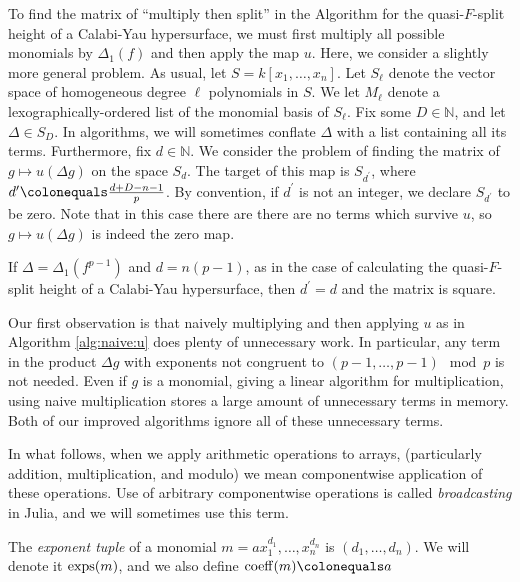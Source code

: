 
To find the matrix of ``multiply then split''
in the Algorithm for the quasi-\(F\)-split height
of a Calabi-Yau hypersurface, 
we must first multiply all possible 
monomials by \(\Delta_{1}(f)\) 
and then apply the map \(u\).
Here, we consider a slightly more general problem.
As usual, let \(S = k[x_{1}, \ldots, x_{n}]\).
Let $S_\ell$ denote the vector space of homogeneous degree $\ell$ polynomials in \(S\).
We let \(M_{\ell}\) denote a lexographically-ordered list
of the monomial basis of \(S_{\ell}\).
Fix some \(D \in \mathbb{N}\), and let \(\Delta \in S_D\).
In algorithms, we will sometimes conflate \(\Delta\) 
with a list containing all its terms.
Furthermore, fix \(d \in \mathbb{N}\).
We consider the problem of finding the matrix of 
\(g \mapsto u(\Delta g)\)
on the space \(S_{d}\).
The target of this map is
\(S_{d^{\prime}}\), where
\(d^{\prime} \colonequals \frac{d+D-n-1}{p}\).
By convention, if \(d^{\prime}\) is not an integer,
we declare \(S_{d^{\prime}}\) to be zero.
Note that in this case there are
there are no terms which survive \(u\), so
\(g \mapsto u(\Delta g)\) is indeed the zero map.

\begin{rmk}
    If \(\Delta = \Delta_{1}(f^{p-1})\) and \(d = n(p-1)\),
	as in the case of calculating the quasi-\(F\)-split
	height of a Calabi-Yau hypersurface, 
	then \(d^{\prime} = d\) and the matrix is 
	square.
\end{rmk}

Our first observation is that naively 
multiplying and then applying \(u\) 
as in Algorithm \ref{alg:naive:u}
does plenty of unnecessary work.
In particular, any term in the 
product \(\Delta g\) with exponents 
not congruent to 
\((p-1, \ldots, p-1) \mod p\)
is not needed. 
Even if \(g\) is a monomial, giving a linear
algorithm for multiplication, using naive
multiplication stores a large amount of unnecessary terms
in memory.
Both of our improved algorithms ignore
all of these unnecessary terms.

In what follows, 
when we apply arithmetic operations to arrays, 
(particularly addition, multiplication, and modulo)
we mean componentwise application of these operations.
Use of arbitrary componentwise operations is called
\textit{broadcasting} in Julia, and we will
sometimes use this term.

\begin{defn}
    The \textit{exponent tuple} of a monomial 
    $m = ax_{1}^{d_1}, \dots, x_{n}^{d_n}$ is $(d_1, \dots, d_n)$. 
	We will denote it $\operatorname{exps}(m)$, and we also 
    define $\coeff(m) \colonequals a$
\end{defn}

